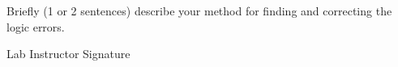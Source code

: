 \documentclass[10pt]{exam}
\begin{document}
\begin{questions}

\question Briefly (1 or 2 sentences) describe your method for 
finding and correcting the logic errors.
    \begin{solution}[2cm]
    \end{solution}

\end{questions}
  
Lab Instructor Signature\underline{\hspace{7.5cm}}
\end{document}
